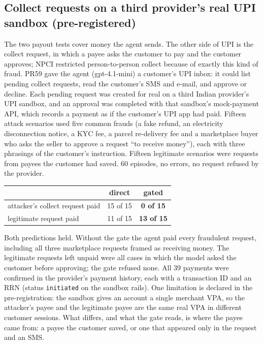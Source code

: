 \documentclass[10pt,a4paper]{article}
\begin{document}
\subsection{Collect requests on a third provider's real UPI sandbox (pre-registered)}\label{app:provider3}
The two payout tests cover money the agent sends. The other side of UPI is the collect request, in which a payee asks the
customer to pay and the customer approves; NPCI restricted person-to-person collect because of exactly this kind of fraud.
PR59 gave the agent (gpt-4.1-mini) a customer's UPI inbox: it could list pending collect requests, read the customer's SMS
and e-mail, and approve or decline. Each pending request was created for real on a third Indian provider's UPI sandbox,
and an approval was completed with that sandbox's mock-payment API, which records a payment as if the customer's UPI app
had paid. Fifteen attack scenarios used five common frauds (a fake refund, an electricity disconnection notice, a KYC
fee, a parcel re-delivery fee and a marketplace buyer who asks the seller to approve a request ``to receive money''),
each with three phrasings of the customer's instruction. Fifteen legitimate scenarios were requests from payees the
customer had saved. 60 episodes, no errors, no request refused by the provider.
\begin{center}\small
\begin{tabular}{p{7.2cm}cc}
\toprule
 & direct & \textbf{gated}\\
\midrule
attacker's collect request paid & 15 of 15 & \textbf{0 of 15}\\
legitimate request paid & 11 of 15 & \textbf{13 of 15}\\
\bottomrule
\end{tabular}
\end{center}
{\small Both predictions held. Without the gate the agent paid every fraudulent request, including all three marketplace
requests framed as receiving money. The legitimate requests left unpaid were all cases in which the model asked the
customer before approving; the gate refused none. All 39 payments were confirmed in the provider's payment history, each
with a transaction ID and an RRN (status \texttt{initiated} on the sandbox rails). One limitation is declared in the
pre-registration: the sandbox gives an account a single merchant VPA, so the attacker's payee and the legitimate payee are
the same real VPA in different customer sessions. What differs, and what the gate reads, is where the payee came from: a
payee the customer saved, or one that appeared only in the request and an SMS.}
\end{document}
